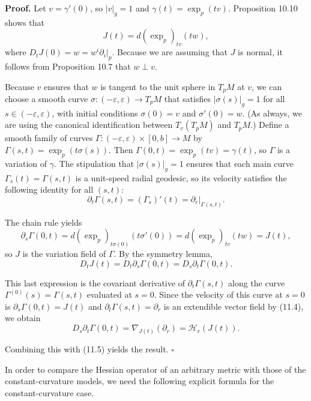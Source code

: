 \textbf{Proof.} Let $v = \gamma'(0)$, so $|v|_g = 1$ and $\gamma(t) = \exp_p(tv)$. Proposition 10.10 shows that
\[
J(t) = d(\exp_p)_{tv}(tw),
\]
where $D_t J(0) = w = w^i \partial_i|_p$. Because we are assuming that $J$ is normal, it follows from Proposition 10.7 that $w \perp v$.

Because $v$ ensures that $w$ is tangent to the unit sphere in $T_p M$ at $v$, we can choose a smooth curve $\sigma : (-\varepsilon, \varepsilon) \to T_p M$ that satisfies $|\sigma(s)|_g = 1$ for all $s \in (-\varepsilon, \varepsilon)$, with initial conditions $\sigma(0) = v$ and $\sigma'(0) = w$. (As always, we are using the canonical identification between $T_v(T_p M)$ and $T_p M$.) Define a smooth family of curves $\Gamma : (-\varepsilon, \varepsilon) \times [0, b] \to M$ by $\Gamma(s, t) = \exp_p(t\sigma(s))$. Then $\Gamma(0, t) = \exp_p(tv) = \gamma(t)$, so $\Gamma$ is a variation of $\gamma$. The stipulation that $|\sigma(s)|_g = 1$ ensures that each main curve $\Gamma_s(t) = \Gamma(s, t)$ is a unit-speed radial geodesic, so its velocity satisfies the following identity for all $(s, t)$:
\begin{equation}
\partial_t \Gamma(s, t) = (\Gamma_s)'(t) = \partial_r\big|_{\Gamma(s,t)}.
\tag{11.4}
\end{equation}

The chain rule yields
\[
\partial_s \Gamma(0, t) = d(\exp_p)_{t\sigma(0)}(t\sigma'(0)) = d(\exp_p)_{tv}(tw) = J(t),
\]
so $J$ is the variation field of $\Gamma$. By the symmetry lemma,
\begin{equation}
D_t J(t) = D_t \partial_s \Gamma(0, t) = D_s \partial_t \Gamma(0, t).
\tag{11.5}
\end{equation}

This last expression is the covariant derivative of $\partial_t \Gamma(s, t)$ along the curve $\Gamma^{(0)}(s) = \Gamma(s, t)$ evaluated at $s = 0$. Since the velocity of this curve at $s = 0$ is $\partial_s \Gamma(0, t) = J(t)$ and $\partial_t \Gamma(s, t) = \partial_r$ is an extendible vector field by (11.4), we obtain
\[
D_s \partial_t \Gamma(0, t) = \nabla_{J(t)}(\partial_r) = \mathcal{H}_r(J(t)).
\]

Combining this with (11.5) yields the result. \quad$\square$

In order to compare the Hessian operator of an arbitrary metric with those of the constant-curvature models, we need the following explicit formula for the constant-curvature case.

